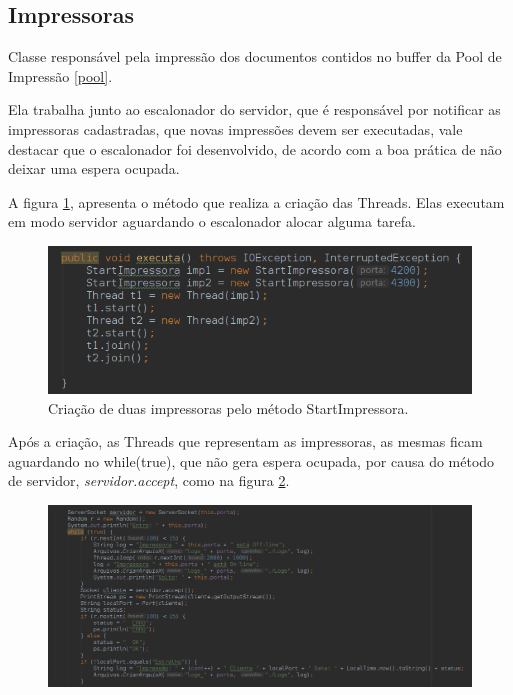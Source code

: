 \documentclass[12pt]{article}
\begin{document}
\subsection{Impressoras}\label{impre}
Classe responsável pela impressão dos documentos contidos  no buffer da Pool de Impressão \ref{pool}.

Ela trabalha junto ao escalonador do servidor, que é responsável por notificar as impressoras cadastradas, que novas impressões devem ser executadas, vale destacar que o escalonador foi desenvolvido, de acordo com a boa prática de não deixar uma espera ocupada.

A figura \ref{fig:screenshot002}, apresenta o método que realiza a criação das Threads.
Elas executam em modo servidor aguardando o escalonador alocar alguma tarefa.
\begin{figure}[H]
	\centering
	\includegraphics[width=1\linewidth]{imagens/screenshot002}
	\caption{Criação de duas impressoras pelo método StartImpressora.}
	\label{fig:screenshot002}
\end{figure}

Após a criação, as Threads que representam as impressoras, as mesmas ficam aguardando no while(true), que não gera espera ocupada, por causa do método de servidor, \textit{servidor.accept}, como na figura  \ref{fig:screenshot003}.
\begin{figure}[H]
	\centering
	\includegraphics[width=1\linewidth]{imagens/screenshot003}
	\caption{}
	\label{fig:screenshot003}
\end{figure}
\end{document}
